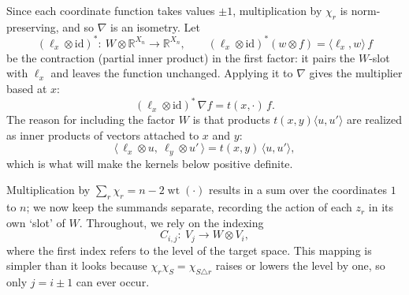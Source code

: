 \documentclass[11pt]{amsart}
\theoremstyle{plain}
\theoremstyle{remark}
\newcommand{\R}{\mathbb{R}}
\newcommand{\la}{\langle}
\newcommand{\ra}{\rangle}
\newcommand{\wt}{\operatorname{wt}}
\begin{document}
Since each coordinate function takes values $\pm1$, multiplication by $\chi_r$ is norm-preserving, and so $\nabla$ is an isometry. Let
\[
 (\ell_x\otimes\mathrm{id})^{*}\colon\ W\otimes\R^{X_n}\to\R^{X_n},
 \qquad
 (\ell_x\otimes\mathrm{id})^{*}(w\otimes f)=\la\ell_x,w\ra\,f
\]
be the contraction (partial inner product) in the first factor: it pairs the $W$-slot with
$\ell_x$ and leaves the function unchanged. Applying it to $\nabla$ gives the multiplier based at $x$:
\[
 (\ell_x\otimes\mathrm{id})^{*}\,\nabla f=t(x,\cdot)\,f .
\]
The reason for including the factor $W$ is that products $t(x,y)\la u,u'\ra$ are realized as inner products of vectors attached to $x$ and $y$:
\[
 \la\,\ell_x\otimes u,\ \ell_y\otimes u'\,\ra=t(x,y)\,\la u,u'\ra ,
\]
which is what will make the kernels below positive definite.

 Multiplication by $\sum_r\chi_r =n-2\wt(\cdot)$ results in a sum over the coordinates $1$ to $n$; we now keep the summands separate, recording the action of each
$z_r$ in its own `slot' of $W$. Throughout, we rely on the indexing
\[
 C_{i,j}\colon\ V_j\longrightarrow W\otimes V_i ,
\]
where the first index refers to the level of the target space. This mapping is
simpler than it looks because $\chi_r\chi_S=\chi_{S\triangle{r}}$ raises or lowers
the level by one, so only $j=i\pm1$ can ever occur.
\end{document}
